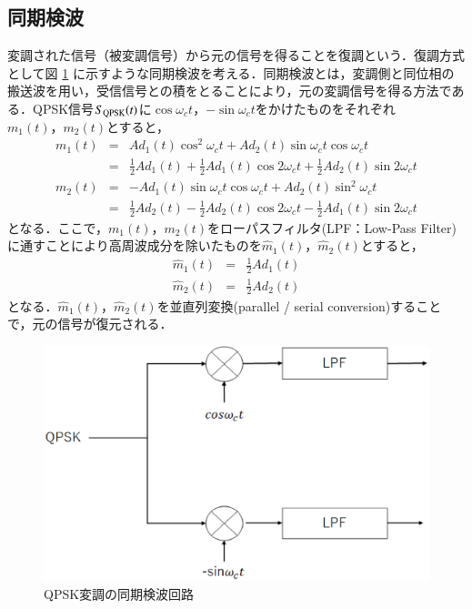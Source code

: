 \subsection{同期検波}
変調された信号（被変調信号）から元の信号を得ることを復調という．復調方式として図 \ref{fig:qpskcoh} に示すような同期検波を考える．同期検波とは，変調側と同位相の搬送波を用い，受信信号との積をとることにより，元の変調信号を得る方法である\cite{takahata}．QPSK信号$S_{{\rm QPSK}}(t)$に$\cos\omega_c t$，$-\sin\omega_c t$をかけたものをそれぞれ$m_1(t)， m_2(t)$とすると，
\begin{eqnarray}
m_1(t)&=&Ad_1(t)\cos^2\omega_ct+Ad_2(t)\sin\omega_ct\cos\omega_ct \nonumber \\
&=&\frac{1}{2}Ad_1(t)+\frac{1}{2}Ad_1(t)\cos2\omega_ct+\frac{1}{2}Ad_2(t)\sin2\omega_ct \\
m_2(t)&=&-Ad_1(t)\sin\omega_ct\cos\omega_ct+Ad_2(t)\sin^2\omega_ct \nonumber \\
&=&\frac{1}{2}Ad_2(t)-\frac{1}{2}Ad_2(t)\cos2\omega_ct-\frac{1}{2}Ad_1(t)\sin2\omega_ct
\end{eqnarray}
となる．ここで，$m_1(t)$，$m_2(t)$をローパスフィルタ(LPF：Low-Pass Filter)に通すことにより高周波成分を除いたものを$\hat{m}_1(t)$，$\hat{m}_2(t)$とすると，
\begin{eqnarray}
\hat{m}_1(t)&=&\frac{1}{2}Ad_1(t)\\
\hat{m}_2(t)&=&\frac{1}{2}Ad_2(t)
\end{eqnarray}
となる．$\hat{m}_1(t)$，$\hat{m}_2(t)$を並直列変換(parallel / serial conversion)することで，元の信号が復元される．
\begin{figure}[h]
  \begin{center}
    \includegraphics[width=0.6\linewidth]{chapter2/figure/douki.eps}
    \caption{QPSK変調の同期検波回路}
    \label{fig:qpskcoh}
  \end{center}
\end{figure}

